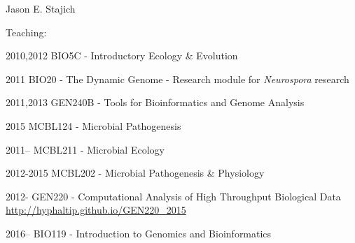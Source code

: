 \documentclass[10pt]{article}
\begin{document}
\begin{cv}{\centerline{Jason E. Stajich}}
\begin{cvlistcompact}{Teaching:}

\item [2010,2012] BIO5C - Introductory Ecology \& Evolution 
\item [2011] BIO20 - The Dynamic Genome - Research module for \textit{Neurospora} research
\item [2011,2013] GEN240B - Tools for Bioinformatics and Genome Analysis
\item [2015] MCBL124 - Microbial Pathogenesis
\item [2011--] MCBL211 - Microbial Ecology
\item [2012-2015] MCBL202 - Microbial Pathogenesis \& Physiology
\item [2012-] GEN220 - Computational Analysis of High Throughput Biological Data \url{http://hyphaltip.github.io/GEN220_2015}
\item [2016--] BIO119 - Introduction to Genomics and Bioinformatics

\end{cvlistcompact}


\end{cv}
\end{document}
